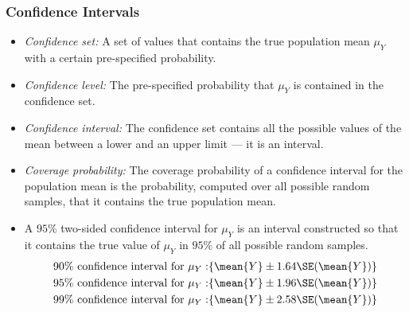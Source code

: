

\begin{frame}
\frametitle{Confidence Intervals}
\begin{itemize}
\item \emph{Confidence set:} A set of values that contains the true population mean $\mu_Y$ with a certain pre-specified probability. 
\item \emph{Confidence level:} The pre-specified probability that $\mu_Y$ is contained in the confidence set.
\item \emph{Confidence interval:} The confidence set contains all the possible values of the mean between a lower and an upper limit --- it is an interval.
\item \emph{Coverage probability:} The coverage probability of a confidence interval for the population mean is the probability, computed over all possible random samples, that it contains the true population mean.
\item A $95\%$ two-sided confidence interval for $\mu_Y$ is an interval constructed so that it contains the true value of $\mu_Y$ in $95\%$ of all possible random samples. 
\begin{align*}
90\% ~\text{confidence interval for}~ \mu_Y: & \{\mean{Y} \pm 1.64 \SE(\mean{Y})\}\\
95\% ~\text{confidence interval for}~ \mu_Y: & \{\mean{Y} \pm 1.96 \SE(\mean{Y})\}\\
99\% ~\text{confidence interval for}~ \mu_Y: & \{\mean{Y} \pm 2.58 \SE(\mean{Y})\}
\end{align*}
\end{itemize}
\end{frame}
